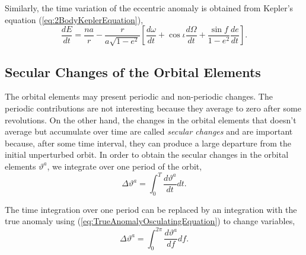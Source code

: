 Similarly, the time variation of the eccentric anomaly is obtained from Kepler's equation (\ref{eq:2BodyKeplerEquation}),
 \begin{equation}
\frac{dE}{dt} =  \frac{na}{r} - \frac{r}{a \sqrt{1-e^2}} \left[ \frac{d \omega }{dt} + \cos \iota \frac{d \Omega}{dt} + \frac{\sin f}{1 - e^2} \frac{de}{dt}  \right] .
 \end{equation}

\subsection{Secular Changes of the Orbital Elements}

The orbital elements may present periodic and non-periodic changes. The periodic contributions are not interesting because they average to zero after some revolutions. On the other hand, the changes in the orbital elements that doesn't average but accumulate over time are called \textit{secular changes} and are important because, after some time interval, they can produce a large departure from the initial unperturbed orbit. In order to obtain the secular changes in the orbital elements $\vartheta^a$, we integrate over one period of the orbit,
\begin{equation}
\Delta \vartheta^a = \int_0 ^T \frac{d\vartheta^a}{dt} dt. \label{eq:OsculatingSecularint}
\end{equation}

The time integration over one period can be replaced by an integration with the true anomaly using (\ref{eq:TrueAnomalyOsculatingEquation}) to change  variables,
\begin{equation}
\Delta \vartheta^a = \int_0 ^{2 \pi} \frac{d\vartheta^a}{df} df.\label{eq:OsculatingSecularinf}
\end{equation}  

